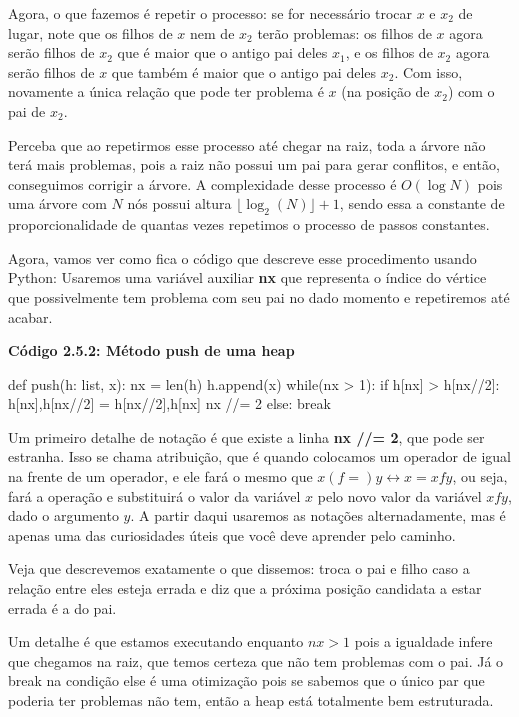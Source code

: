\documentclass[11pt, a4paper]{article}
\begin{document}
Agora, o que fazemos é repetir o processo: se for necessário trocar \(x\) e \(x_2\) de lugar, note que os filhos de \(x\) nem de \(x_2\) terão problemas: os filhos de \(x\) agora serão filhos de \(x_2\) que é maior que o antigo pai deles \(x_1\), e os filhos de \(x_2\) agora serão filhos de \(x\) que também é maior que o antigo pai deles \(x_2\). Com isso, novamente a única relação que pode ter problema é \(x\) (na posição de \(x_2\)) com o pai de \(x_2\). 

Perceba que ao repetirmos esse processo até chegar na raiz, toda a árvore não terá mais problemas, pois a raiz não possui um pai para gerar conflitos, e então, conseguimos corrigir a árvore. A complexidade desse processo é \(O(\log N)\) pois uma árvore com \(N\) nós possui altura \(\lfloor\log_2(N)\rfloor+1\), sendo essa a constante de proporcionalidade de quantas vezes repetimos o processo de passos constantes.

Agora, vamos ver como fica o código que descreve esse procedimento usando Python: Usaremos uma variável auxiliar \textbf{nx} que representa o índice do vértice que possivelmente tem problema com seu pai no dado momento e repetiremos até acabar.

\textbf{Código 2.5.2: Método push de uma heap}

\begin{code}
def push(h: list, x):
    nx = len(h)
    h.append(x)
    while(nx > 1):
        if h[nx] > h[nx//2]:
            h[nx],h[nx//2] = h[nx//2],h[nx]
            nx //= 2
        else:
            break
\end{code}

Um primeiro detalhe de notação é que existe a linha \textbf{nx //= 2}, que pode ser estranha. Isso se chama atribuição, que é quando colocamos um operador de igual na frente de um operador, e ele fará o mesmo que \(x (f=) y \leftrightarrow x = x f y\), ou seja, fará a operação e substituirá o valor da variável \(x\) pelo novo valor da variável \(xfy\), dado o argumento \(y\). A partir daqui usaremos as notações alternadamente, mas é apenas uma das curiosidades úteis que você deve aprender pelo caminho.

Veja que descrevemos exatamente o que dissemos: troca o pai e filho caso a relação entre eles esteja errada e diz que a próxima posição candidata a estar errada é a do pai.

Um detalhe é que estamos executando enquanto \(nx>1\) pois a igualdade infere que chegamos na raiz, que temos certeza que não tem problemas com o pai. Já o break na condição else é uma otimização pois se sabemos que o único par que poderia ter problemas não tem, então a heap está totalmente bem estruturada.
\end{document}
